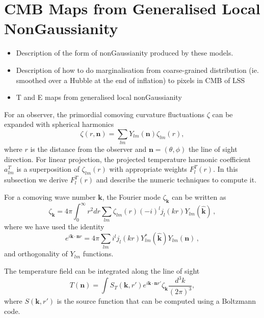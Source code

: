 \section{CMB Maps from Generalised Local NonGaussianity}
\begin{itemize}
\item Description of the form of nonGaussianity produced by these models.
\item Description of how to do marginalisation from coarse-grained distribution (ie. smoothed over a Hubble at the end of inflation) to pixels in CMB of LSS
\item T and E maps from generalised local nonGaussianity
\end{itemize}

For an observer,  the primordial comoving curvature fluctuations  $\zeta$ can be expanded with spherical harmonics
\begin{equation}
  \zeta(r, \mathbf{n}) = \sum_{lm} Y_{lm}(\mathbf{n})\zeta_{lm}(r),
\end{equation}
where $r$ is the distance from the observer and $\mathbf{n} = (\theta, \phi)$ the line of sight direction. For linear projection, the projected temperature harmonic coefficient $a_{lm}^T$ is a superposition of $\zeta_{lm}(r)$ with appropriate weights $F_l^T(r)$. In this subsection we derive $F_l^T(r)$ and describe the numeric techniques to compute it.

 For a comoving wave number $\mathbf{k}$, the Fourier mode $\zeta_{\mathbf{k}}$ can be written as
\begin{equation}
  \zeta_{\mathbf{k}} = 4\pi \int_0^\infty r^2dr\sum_{lm}\zeta_{lm}(r) (-i)^l j_l(kr) Y_{lm}(\hat{\mathbf{k}})\, , \label{eq:zetakint}
\end{equation}
where we have used the identity
\begin{equation}
  e^{i\mathbf{k}\cdot\mathbf{n}r} = 4\pi \sum_{lm}i^l j_l(kr) Y^*_{lm}(\hat{\mathbf{k}}) Y_{lm}(\mathbf{n}) \, , \label{eq:eikx_expand}
\end{equation}
and orthogonality of $Y_{lm}$ functions.


The temperature field can be integrated along the line of sight
\begin{equation}
T({\mathbf{n}}) = \int S_T(\mathbf{k}, r') e^{i \mathbf{k}\cdot\mathbf{n} r'}\zeta_{\mathbf{k}}\frac{d^3k}{(2\pi)^3}, \label{eq:Tint1}
\end{equation}
where $S(\mathbf{k}, r')$ is the source function that can be computed using a Boltzmann code.

